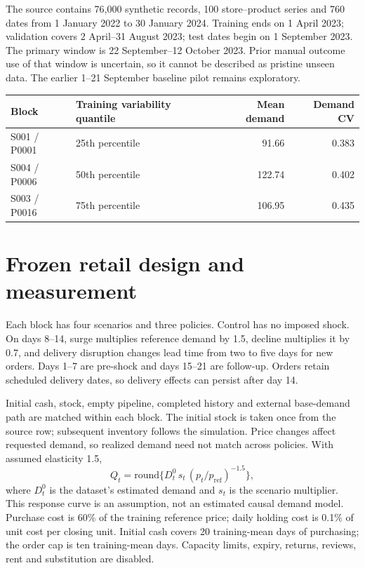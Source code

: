 \documentclass[11pt,a4paper]{article}
\begin{document}
The source contains 76,000 synthetic records, 100 store--product series and 760 dates from 1 January 2022 to 30 January 2024. Training ends on 1 April 2023; validation covers 2 April--31 August 2023; test dates begin on 1 September 2023. The primary window is 22 September--12 October 2023. Prior manual outcome use of that window is uncertain, so it cannot be described as pristine unseen data. The earlier 1--21 September baseline pilot remains exploratory.

\begin{center}\small
\begin{tabular}{llrr}
\toprule Block & Training variability quantile & Mean demand & Demand CV\\\midrule
S001 / P0001 & 25th percentile & 91.66 & 0.383\\
S004 / P0006 & 50th percentile & 122.74 & 0.402\\
S003 / P0016 & 75th percentile & 106.95 & 0.435\\\bottomrule
\end{tabular}
\label{tab:series}
\end{center}

\clearpage
\section{Frozen retail design and measurement}
Each block has four scenarios and three policies. Control has no imposed shock. On days 8--14, surge multiplies reference demand by 1.5, decline multiplies it by 0.7, and delivery disruption changes lead time from two to five days for new orders. Days 1--7 are pre-shock and days 15--21 are follow-up. Orders retain scheduled delivery dates, so delivery effects can persist after day 14.

Initial cash, stock, empty pipeline, completed history and external base-demand path are matched within each block. The initial stock is taken once from the source row; subsequent inventory follows the simulation. Price changes affect requested demand, so realized demand need not match across policies. With assumed elasticity 1.5,
\[ Q_t=\mathrm{round}\{D_t^{0}\,s_t\,(p_t/p_{\mathrm{ref}})^{-1.5}\}, \]
where $D_t^{0}$ is the dataset's estimated demand and $s_t$ is the scenario multiplier. This response curve is an assumption, not an estimated causal demand model. Purchase cost is 60\% of the training reference price; daily holding cost is 0.1\% of unit cost per closing unit. Initial cash covers 20 training-mean days of purchasing; the order cap is ten training-mean days. Capacity limits, expiry, returns, reviews, rent and substitution are disabled.
\end{document}
